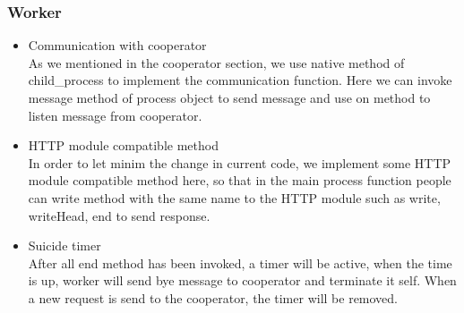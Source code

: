 \documentclass[JIP]{ipsj}
\begin{document}
\subsubsection{Worker}
\begin{itemize}
	\item Communication with cooperator\\
	As we mentioned in the cooperator section, we use native method of child\_process to implement the communication function. Here we can invoke message method of process object to send message and use on method to listen message from cooperator. 
	\item HTTP module compatible method\\
	In order to let minim the change in current code, we implement some HTTP module compatible method here, so that in the main process function people can write method with the same name to the HTTP module such as write, writeHead, end to send response.

	\item Suicide timer\\
	After all end method has been invoked, a timer will be active, when the time is up, worker will send bye message to cooperator and terminate it self.
	When a new request is send to the cooperator, the timer will be removed.

\end{itemize}
\end{document}
